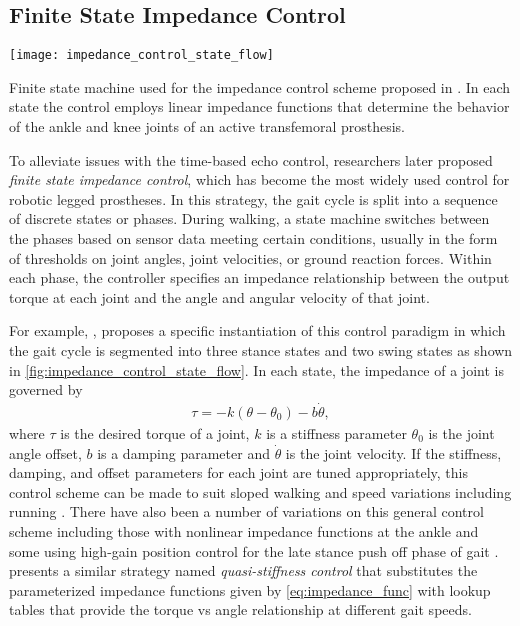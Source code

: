 \subsection{Finite State Impedance Control}
\begin{marginfigure}
    \centering
    \texttt{[image: impedance\_control\_state\_flow]}
    \caption{Finite state machine used for the impedance control scheme proposed
    in \citet{sup2009preliminary}. In each state the control employs linear
    impedance functions that determine the behavior of the ankle and knee joints
    of an active transfemoral
    prosthesis.}\label{fig:impedance_control_state_flow}
\end{marginfigure}
To alleviate issues with the time-based echo control, researchers later proposed
\emph{finite state impedance control}, which has become the most widely used
control for robotic legged prostheses. In this strategy, the gait cycle is split
into a sequence of discrete states or phases. During walking, a state machine
switches between the phases based on sensor data meeting certain conditions,
usually in the form of thresholds on joint angles, joint velocities, or ground
reaction forces. Within each phase, the controller specifies an impedance
relationship between the output torque at each joint and the angle and angular
velocity of that joint.

For example, \citet{sup2009preliminary}, proposes a specific instantiation of
this control paradigm in which the gait cycle is segmented into three stance
states and two swing states as shown in \cref{fig:impedance_control_state_flow}.
In each state, the impedance of a joint is governed by
\begin{align}
    \tau = -k (\theta - \theta_{0}) - b \dot \theta,\label{eq:impedance_func}
\end{align}
where $\tau$ is the desired torque of a joint, $k$ is a stiffness parameter
$\theta_{0}$ is the joint angle offset, $b$ is a damping parameter and $\dot
\theta$ is the joint velocity. If the stiffness, damping, and offset parameters
for each joint are tuned appropriately, this control scheme can be made to suit
sloped walking \citep{sup2011upslope} and speed variations
\citep{shultz2016variable} including running \citep{shultz2015running}. There
have also been a number of variations on this general control scheme including
those with nonlinear impedance functions at the ankle
\citep{sup2007design,shultz2014walking} and some using high-gain position
control for the late stance push off phase of gait \citep{lawson2014robotic}.
\citet{lenzi2014speed} presents a similar strategy named \emph{quasi-stiffness
control} that substitutes the parameterized impedance functions given by
\cref{eq:impedance_func} with lookup tables that provide the torque vs angle
relationship at different gait speeds. 


